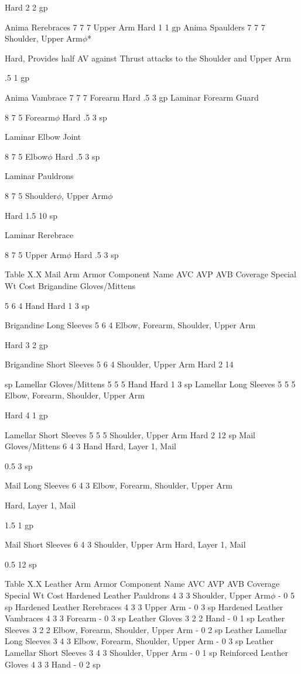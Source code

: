 \documentclass[oneside,11pt,english]{book}
\begin{document}
Hard 2 2 gp 

Anima Rerebraces 7 7 7 Upper Arm Hard 1 1 gp 
Anima Spaulders 7 7 7 Shoulder, Upper 
Arm$\phi$* 

Hard, Provides half AV against Thrust attacks 
to the Shoulder and Upper Arm 

.5 1 gp 

Anima Vambrace 7 7 7 Forearm Hard .5 3 gp 
Laminar Forearm 
Guard 

8 7 5 Forearm$\phi$ Hard .5 3 sp 

Laminar Elbow 
Joint 

8 7 5 Elbow$\phi$ Hard .5 3 sp 

Laminar 
Pauldrons 

8 7 5 Shoulder$\phi$, Upper 
Arm$\phi$ 

Hard 1.5 10 
sp 

Laminar 
Rerebrace 

8 7 5 Upper Arm$\phi$ Hard .5 3 sp 

 
Table X.X Mail Arm Armor 
Component Name AVC AVP AVB Coverage Special Wt Cost 
Brigandine 
Gloves/Mittens 

5 6 4 Hand Hard 1 3 sp 

Brigandine Long Sleeves 5 6 4 Elbow, Forearm, Shoulder, Upper 
Arm 

Hard 3 2 gp 

Brigandine Short Sleeves 5 6 4 Shoulder, Upper Arm Hard 2 14 


sp 
Lamellar Gloves/Mittens 5 5 5 Hand Hard 1 3 sp 
Lamellar Long Sleeves 5 5 5 Elbow, Forearm, Shoulder, Upper 
Arm 

Hard 4 1 gp 

Lamellar Short Sleeves 5 5 5 Shoulder, Upper Arm Hard 2 12 
sp 
Mail Gloves/Mittens 6 4 3 Hand Hard, Layer 1, 
Mail 

0.5 3 sp 

Mail Long Sleeves 6 4 3 Elbow, Forearm, Shoulder, Upper 
Arm 

Hard, Layer 1, 
Mail 

1.5 1 gp 

Mail Short Sleeves 6 4 3 Shoulder, Upper Arm Hard, Layer 1, 
Mail 

0.5 12 
sp 

 
Table X.X Leather Arm Armor 
Component Name AVC AVP AVB Coverage Special Wt Cost 
Hardened Leather Pauldrons 4 3 3 Shoulder, Upper Arm$\phi$ - 0 5 sp 
Hardened Leather Rerebraces 4 3 3 Upper Arm - 0 3 sp 
Hardened Leather Vambraces 4 3 3 Forearm - 0 3 sp 
Leather Gloves 3 2 2 Hand - 0 1 sp 
Leather Sleeves 3 2 2 Elbow, Forearm, Shoulder, Upper Arm - 0 2 sp 
Leather Lamellar Long Sleeves 3 4 3 Elbow, Forearm, Shoulder, Upper Arm - 0 3 sp 
Leather Lamellar Short Sleeves 3 4 3 Shoulder, Upper Arm - 0 1 sp 
Reinforced Leather Gloves 4 3 3 Hand - 0 2 sp 
\end{document}
